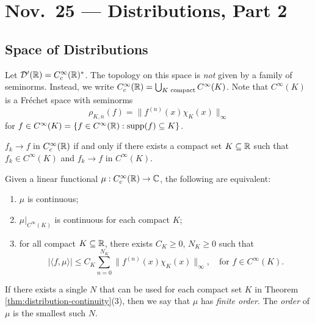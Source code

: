 \chapter{Nov.~25 --- Distributions, Part 2}

\section{Space of Distributions}

\begin{remark}
  Let $\mathcal{D}'(\mathbb{R}) = C^\infty_c(\mathbb{R})^*$.
  The topology on this
  space is \emph{not} given by a
  family of seminorms. Instead, we
  write $C^\infty_c(\mathbb{R}) = \bigcup_{K \text{ compact}} C^\infty(K)$.
  Note that $C^\infty(K)$ is a Fr\'echet space with seminorms
  \[
    \rho_{K, n}(f)
    = \|f^{(n)}(x) \chi_K(x)\|_\infty
  \]
  for $f \in C^\infty(K) = \{f \in C^\infty(\mathbb{R}) : \operatorname{supp}(f) \subseteq K\}$.
\end{remark}

\begin{theorem}
  $f_k \to f$ in $C^\infty_c(\mathbb{R})$ if and
  only if there exists a compact set
  $K \subseteq \mathbb{R}$ such that
  $f_k \in C^\infty(K)$ and
  $f_k \to f$ in $C^\infty(K)$.
\end{theorem}

\begin{theorem}\label{thm:distribution-continuity}
  Given a linear functional
  $\mu : C^\infty_c(\mathbb{R}) \to \mathbb{C}$,
  the following are equivalent:
  \begin{enumerate}
    \item $\mu$ is continuous;
    \item $\mu|_{C^\infty(K)}$ is
      continuous for each compact $K$;
    \item for all compact $K \subseteq \mathbb{R}$,
      there exists $C_K \ge 0$, $N_K \ge 0$
      such that
      \[
        |\langle f, \mu \rangle|
        \le C_K \sum_{n = 0}^{N_K}
        \|f^{(n)}(x) \chi_K(x)\|_\infty,
        \quad \text{for } f \in C^\infty(K).
      \]
  \end{enumerate}
\end{theorem}

\begin{definition}
  If there exists a single $N$ that
  can be used for each compact set $K$ in
  Theorem \ref{thm:distribution-continuity}(3),
  then we say that $\mu$ has
  \emph{finite order}. The \emph{order} of
  $\mu$ is the smallest such $N$.
\end{definition}

